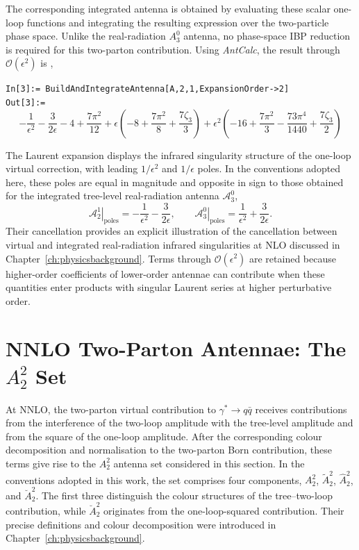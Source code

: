 The corresponding integrated antenna is obtained by evaluating these scalar one-loop functions and
integrating the resulting expression over the two-particle phase space. Unlike the real-radiation
$A_3^0$ antenna, no phase-space IBP reduction is required for this two-parton contribution. Using
\textit{AntCalc}, the result through $\mathcal O(\epsilon^2)$ is \cite{Gehrmann-DeRidder:2005btv},

\begin{mdframed}[backgroundcolor=gray!10, linewidth=0pt]
\texttt{In[3]:= BuildAndIntegrateAntenna[A,2,1,ExpansionOrder->2]}\\
\hfill
\texttt{Out[3]:=}
    \begin{equation*}
        -\frac1{\epsilon^2}-\frac3{2\epsilon}-4+\frac{7\pi^2}{12}+\epsilon\!\left(-8+\frac{7\pi^2}8+\frac{7\zeta_3}3\right)+\epsilon^2\!\left(-16+\frac{7\pi^2}{3}-\frac{73\pi^4}{1440}+\frac{7\zeta_3}2\right)
    \end{equation*}
\end{mdframed}

The Laurent expansion displays the infrared singularity structure of the one-loop virtual correction,
with leading $1/\epsilon^2$ and $1/\epsilon$ poles. In the conventions adopted here, these poles are
equal in magnitude and opposite in sign to those obtained for the integrated tree-level
real-radiation antenna $\mathcal A_3^0$,
\begin{equation*}
    \left.\mathcal A_2^1\right|_{\mathrm{poles}} = -\frac{1}{\epsilon^2}-\frac{3}{2\epsilon}, \qquad
    \left.\mathcal A_3^0\right|_{\mathrm{poles}} = \frac{1}{\epsilon^2}+\frac{3}{2\epsilon}.
\end{equation*}
Their cancellation provides an explicit illustration of the cancellation between virtual and
integrated real-radiation infrared singularities at NLO discussed in
Chapter~\ref{ch:physicsbackground}. Terms through $\mathcal O(\epsilon^2)$ are retained because
higher-order coefficients of lower-order antennae can contribute when these quantities enter products
with singular Laurent series at higher perturbative order.


\section{NNLO Two-Parton Antennae: The $A_2^2$ Set}\label{subsec:A22}

At NNLO, the two-parton virtual contribution to $\gamma^*\to q\bar q$ receives contributions from the
interference of the two-loop amplitude with the tree-level amplitude and from the square of the
one-loop amplitude. After the corresponding colour decomposition and normalisation to the two-parton
Born contribution, these terms give rise to the $A_2^2$ antenna set considered in this section. In
the conventions adopted in this work, the set comprises four components, $A_2^2$, $\tilde A_2^2$,
$\hat A_2^2$, and $\breve A_2^2$. The first three distinguish the colour structures of the
tree--two-loop contribution, while $\breve A_2^2$ originates from the one-loop-squared contribution.
Their precise definitions and colour decomposition were introduced in
Chapter~\ref{ch:physicsbackground}.

